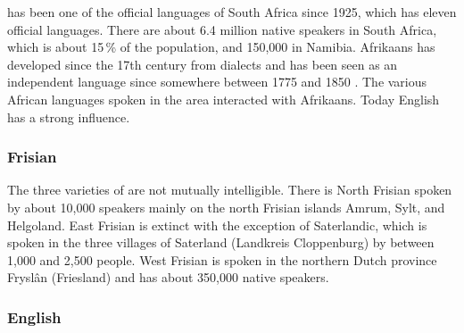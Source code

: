  has been one of the official languages of South Africa since 1925, which has eleven official languages.
There are about 6.4 million native speakers in South Africa, which is about 15\,\% of the population,
and 150,000 in Namibia. Afrikaans has developed since the 17th century from  dialects and has
been seen as an independent language since somewhere between 1775 and 1850 
\citep[]{denBesten2012a-u}.
The various African languages spoken in the area interacted with Afrikaans.
Today English has a strong influence.



\subsubsection{Frisian}

The three varieties of  are not mutually intelligible. There is North Frisian spoken by
about 10,000 speakers mainly on the north Frisian islands Amrum, Sylt, and Helgoland. East Frisian
is extinct with the exception of Saterlandic, which is spoken in the three villages of Saterland
(Landkreis Cloppenburg) by between 1,000 and 2,500 people.
West Frisian is spoken in the northern Dutch province Fryslân (Friesland) and has about 350,000
native speakers.



\subsubsection{English}

